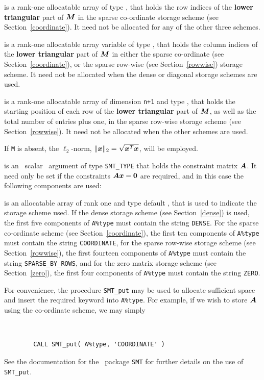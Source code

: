 \documentclass{galahad}
\begin{document}
\begin{description}
\begin{description}
 is a rank-one allocatable array of type \integer,
that holds the row indices of the {\bf lower triangular} part of ${\bm{M}}$
in the sparse co-ordinate storage
scheme (see Section~\ref{coordinate}).
It need not be allocated for any of the other three schemes.

 is a rank-one allocatable array variable of type \integer,
that holds the column indices of the {\bf lower triangular} part of
${\bm{M}}$ in either the sparse co-ordinate
(see Section~\ref{coordinate}), or the sparse row-wise
(see Section~\ref{rowwise}) storage scheme.
It need not be allocated when the dense or diagonal storage schemes are used.

 is a rank-one allocatable array of dimension {\tt n+1} and type
\integer, that holds the starting position of
each row of the {\bf lower triangular} part of ${\bm{M}}$, as well
as the total number of entries plus one, in the sparse row-wise storage
scheme (see Section~\ref{rowwise}). It need not be allocated when the
other schemes are used.

\end{description}
If {\tt M} is absent, the $\ell_2$-norm, $\|{\bm{x}}\|_2 = \sqrt{{\bm{x}}^T {\bm{x}}}$,
will be employed.

 is an \optional\ scalar \intentin\ argument of type {\tt SMT\_TYPE}
that holds the constraint matrix ${\bm{A}}$. It need only be set
if the constraints ${\bm{A}} {\bm{x}} = {\bm{0}}$ are required,
and in this case the following components are used:

\begin{description}

 is an allocatable array of rank one and type default
\character, that
is used to indicate the storage scheme used. If the dense storage scheme
(see Section~\ref{dense}) is used,
the first five components of {\tt A\%type} must contain the
string {\tt DENSE}.
For the sparse co-ordinate scheme (see Section~\ref{coordinate}),
the first ten components of {\tt A\%type} must contain the
string {\tt COORDINATE},
for the sparse row-wise storage scheme (see Section~\ref{rowwise}),
the first fourteen components of {\tt A\%type} must contain the
string {\tt SPARSE\_BY\_ROWS},
and for the zero matrix storage scheme (see Section~\ref{zero}),
the first four components of {\tt A\%type} must contain the
string {\tt ZERO}.

For convenience, the procedure {\tt SMT\_put}
may be used to allocate sufficient space and insert the required keyword
into {\tt A\%type}.
For example, if we wish to store ${\bm{A}}$ using the co-ordinate scheme,
we may simply
{\tt
\begin{verbatim}
        CALL SMT_put( A%type, 'COORDINATE' )
\end{verbatim}
}
\noindent
See the documentation for the \galahad\ package {\tt SMT}
for further details on the use of {\tt SMT\_put}.


\end{description}
\end{description}
\end{document}
